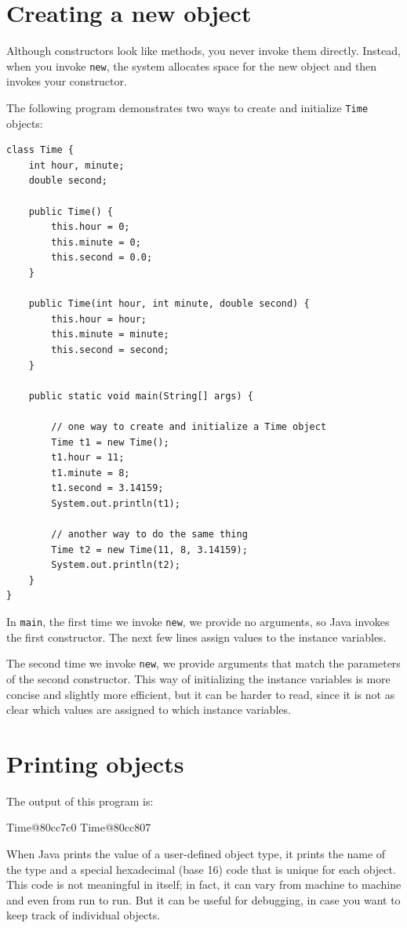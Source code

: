 \section{Creating a new object}

Although constructors look like methods, you never invoke them
directly.  Instead, when you invoke {\tt new}, the system
allocates space for the new object and then
invokes your constructor.

The following program demonstrates two ways to create and
initialize {\tt Time} objects:

\begin{lstlisting}
class Time {
    int hour, minute;
    double second;

    public Time() {
        this.hour = 0;
        this.minute = 0;
        this.second = 0.0;
    }

    public Time(int hour, int minute, double second) {
        this.hour = hour;
        this.minute = minute;
        this.second = second;
    }

    public static void main(String[] args) {

        // one way to create and initialize a Time object
        Time t1 = new Time();
        t1.hour = 11;
        t1.minute = 8;
        t1.second = 3.14159;
        System.out.println(t1);

        // another way to do the same thing
        Time t2 = new Time(11, 8, 3.14159);
        System.out.println(t2);
    }
}
\end{lstlisting}
%
In {\tt main}, the first time we invoke {\tt new},
we provide no arguments, so Java invokes the first constructor.
The next few lines assign values to the instance
variables.

The second time we invoke {\tt new}, we provide
arguments that match the parameters of the second constructor.
This way of initializing the instance variables is more concise
and slightly more efficient, but it can be harder to read, since
it is not as clear which values are assigned to which instance
variables.


\section{Printing objects}
\label{printobject}

The output of this program is:

\begin{verbatimtab}
Time@80cc7c0
Time@80cc807
\end{verbatimtab}
%
When Java prints the value of a user-defined object type, it prints
the name of the type and a special hexadecimal (base 16) code that is
unique for each object.  This code is not meaningful in itself; in
fact, it can vary from machine to machine and even from run to run.
But it can be useful for debugging, in case you want to keep track of
individual objects.

